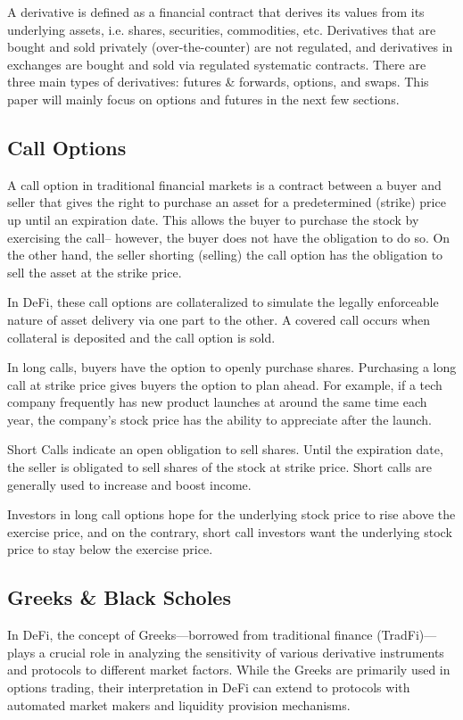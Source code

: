 \documentclass[12pt]{article}
\begin{document}
A derivative is defined as a financial contract that derives its values from its underlying assets, i.e. shares, securities, commodities, etc. Derivatives that are bought and sold privately (over-the-counter) are not regulated, and derivatives in exchanges are bought and sold via regulated systematic contracts.
There are three main types of derivatives: futures \& forwards, options, and swaps. This paper will mainly focus on options and futures in the next few sections.
\subsection{Call Options}
A call option in traditional financial markets is a contract between a buyer and seller that gives the right to purchase an asset for a predetermined (strike) price up until an expiration date. This allows the buyer to purchase the stock by exercising the call– however, the buyer does not have the obligation to do so. On the other hand, the seller shorting (selling) the call option has the obligation to sell the asset at the strike price. 

In DeFi, these call options are collateralized to simulate the legally enforceable nature of asset delivery via one part to the other. A covered call occurs when collateral is deposited and the call option is sold. 

In long calls, buyers have the option to openly purchase shares. Purchasing a long call at strike price gives buyers the option to plan ahead. For example, if a tech company frequently has new product launches at around the same time each year, the company’s stock price has the ability to appreciate after the launch. 

Short Calls indicate an open obligation to sell shares. Until the expiration date, the seller is obligated to sell shares of the stock at strike price. Short calls are generally used to increase and boost income. 

Investors in long call options hope for the underlying stock price to rise above the exercise price, and on the contrary, short call investors want the underlying stock price to stay below the exercise price. 

\subsection{Greeks \& Black Scholes}\label{subsec:greeks}
In DeFi, the concept of Greeks—borrowed from traditional finance (TradFi)—plays a crucial role in analyzing the sensitivity of various derivative instruments and protocols to different market factors. While the Greeks are primarily used in options trading, their interpretation in DeFi can extend to protocols with automated market makers and liquidity provision mechanisms.
\end{document}
